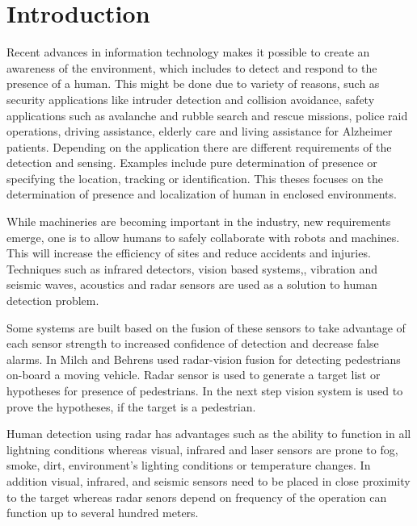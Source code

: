 \section{Introduction}
Recent advances in information technology makes it possible to create an awareness of the environment, which includes to detect and respond to the presence of a human. This might be done due to variety of reasons, such as security applications like intruder detection and collision avoidance, safety applications such as avalanche and rubble search and rescue missions, police raid operations, driving assistance, elderly care and living assistance for Alzheimer patients.
Depending on the application there are different requirements of the detection and sensing. Examples include pure determination of presence or specifying the location, tracking or identification. This theses focuses on the determination of presence and localization of human in enclosed environments. 

While machineries are becoming important in the industry, new requirements emerge, one is to allow humans to safely collaborate with robots and machines. This will increase the efficiency of sites and reduce accidents and injuries. Techniques such as infrared detectors\cite{InfraredHumanDetection}, vision based systems\cite{VisualSurveillanceBoult},\cite{Visualhumandetection}, vibration and seismic waves\cite{VibrationTracking}, acoustics\cite{AcousticsHumanDetection} and radar sensors\cite{YarovoyUWBHumanDetection} are used as a solution to human detection problem.

Some systems are built based on the fusion of these sensors to take advantage of each sensor strength to increased confidence of detection and decrease false alarms.
In\cite{RadarVisionfusion} Milch and Behrens used radar-vision fusion for detecting pedestrians on-board a moving vehicle. Radar sensor is used to generate a target list or hypotheses for presence of pedestrians. In the next step vision system is used to prove the hypotheses, if the target is a pedestrian. 

Human detection using radar has advantages such as the ability to function in all lightning conditions whereas visual, infrared and laser sensors are prone to fog, smoke, dirt, environment’s lighting conditions or temperature changes. In addition visual, infrared, and seismic sensors need to be placed in close proximity to the target whereas radar senors depend on frequency of the operation can function up to several hundred meters.

